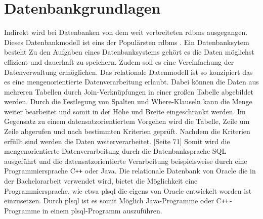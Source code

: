 \section{Datenbankgrundlagen} 
Indirekt wird bei Datenbanken von dem weit verbreiteten \acrfull{rdbms} ausgegangen. Dieses Datenbankmodell ist eins der Populärsten \acrshort{rdbms} \cite{DB16}. Ein Datenbanksytem besteht Zu den Aufgaben eines Datenbanksystems gehört es die Daten möglichst effizient und dauerhaft zu speichern. Zudem soll es eine Vereinfachung der Datenverwaltung ermöglichen. Das relationale Datenmodell ist so konzipiert das es eine mengenorientierte Datenverarbeitung erlaubt. Dabei können die Daten aus mehreren Tabellen durch Join-Verknüpfungen in einer großen Tabelle abgebildet werden. Durch die Festlegung von Spalten und Where-Klauseln kann die Menge weiter bearbeitet und somit in der Höhe und Breite eingeschränkt werden. Im Gegensatz zu einem datensatzorientiertem Vorgehen wird die Tabelle, Zeile um Zeile abgerufen und nach bestimmten Kriterien geprüft. Nachdem die Kriterien erfüllt sind werden die Daten weiterverarbeitet. \cite{Kemper2011}[Seite 71] Somit wird die mengenorientierte Datenverarbeitung durch die Datenbanksprache SQL ausgeführt und die datensatzorientierte Verarbeitung beispielsweise durch eine Programmiersprache C\texttt{++} oder Java. Die relationale Datenbank von Oracle die in der Bachelorarbeit verwendet wird, bietet die Möglichkeit eine Programmiersprache, wie etwa \acrshort{plsql} die eigens von Oracle entwickelt worden ist einzusetzen. Durch \acrshort{plsql} ist es somit Möglich Java-Programme oder C\texttt{++}\,-Programme in einem \acrshort{plsql}-Programm auszuführen.

